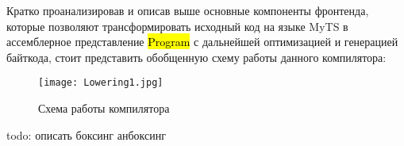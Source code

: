 Кратко проанализировав и описав выше основные компоненты фронтенда, которые позволяют трансформировать исходный код на
языке MyTS в ассемблерное представление \hl{Program} с дальнейшей оптимизацией и генерацией байткода,
стоит представить обобщенную схему работы данного компилятора:

\begin{figure}[h]
    \centering
    \texttt{[image: Lowering1.jpg]}
    \caption{Схема работы компилятора}\label{fig:figure}
\end{figure}

todo: описать боксинг анбоксинг

\newpage
